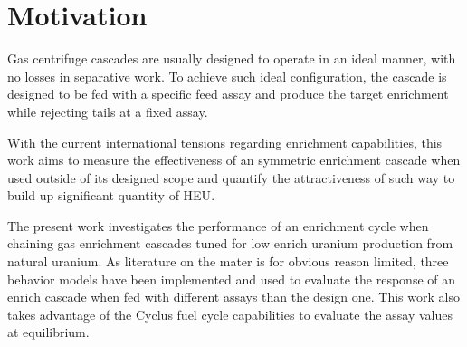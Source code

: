 \section{Motivation}

Gas centrifuge cascades are usually designed to operate in an ideal manner, with
no losses in separative work. To achieve such ideal configuration, the cascade
is designed to be fed with a specific feed assay and produce the target
enrichment while rejecting tails at a fixed assay.

With the current international tensions regarding enrichment capabilities, this
work aims to measure the effectiveness of an symmetric enrichment cascade when
used outside of its designed scope and quantify the attractiveness of such way
to build up significant quantity of \gls{HEU}.

The present work investigates the performance of an enrichment cycle when chaining
gas enrichment cascades tuned for low enrich uranium production from natural
uranium. As literature on the mater is for obvious reason limited, three
behavior models have been implemented and used to evaluate the response of an
enrich cascade when fed with different assays than the design one. This work
also takes advantage of the Cyclus\cite{cyclus} fuel cycle capabilities to
evaluate the assay values at equilibrium.


